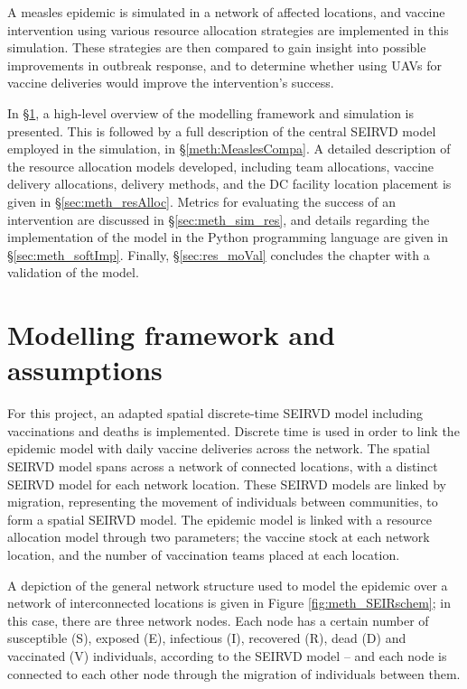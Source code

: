 A measles epidemic is simulated in a network of affected locations, and vaccine intervention using various resource allocation strategies are implemented in this simulation. These strategies are then compared to gain insight into possible improvements in outbreak response, and to determine whether using UAVs for vaccine deliveries would improve the intervention's success. 

In \S \ref{sec:met_modfr}, a high-level overview of the modelling framework and simulation is presented. This is followed by a full description of the central SEIRVD model employed in the simulation, in \S \ref{meth:MeaslesCompa}. A detailed description of the resource allocation models developed, including team allocations, vaccine delivery allocations, delivery methods, and the DC facility location placement is given in \S \ref{sec:meth_resAlloc}. Metrics for evaluating the success of an intervention are discussed in \S \ref{sec:meth_sim_res}, and details regarding the implementation of the model in the Python programming language are given in \S \ref{sec:meth_softImp}. Finally, \S \ref{sec:res_moVal} concludes the chapter with a validation of the model.

\section{Modelling framework and assumptions}
\label{sec:met_modfr}
For this project, an adapted spatial discrete-time SEIRVD model including vaccinations and deaths is implemented. Discrete time is used in order to link the epidemic model with daily vaccine deliveries across the network. The spatial SEIRVD model spans across a network of connected locations, with a distinct SEIRVD model for each network location. These SEIRVD models are linked by migration, representing the movement of individuals between communities, to form a spatial SEIRVD model. The epidemic model is linked with a resource allocation model through two parameters; the vaccine stock at each network location, and the number of vaccination teams placed at each location. 

A depiction of the general network structure used to model the epidemic over a network of interconnected locations is given in Figure \ref{fig:meth_SEIRschem}; in this case, there are three network nodes. Each node has a certain number of susceptible (S), exposed (E), infectious (I), recovered (R), dead (D) and vaccinated (V) individuals, according to the SEIRVD model -- and each node is connected to each other node through the migration of individuals between them. 

